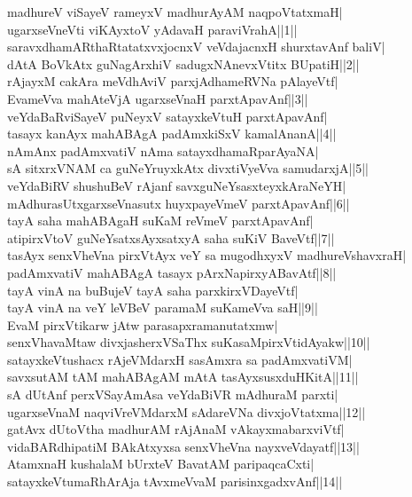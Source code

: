 \documentclass{article}
\begin{document}
madhureV viSayeV rameyxV madhurAyAM naqpoVtatxmaH|\\
ugarxseVneVti viKAyxtoV yAdavaH paraviVrahA||1||\\
saravxdhamARthaRtatatxvxjocnxV veVdajacnxH shurxtavAnf baliV|\\
dAtA BoVkAtx guNagArxhiV sadugxNAnevxVtitx BUpatiH||2||\\
rAjayxM cakAra meVdhAviV parxjAdhameRVNa pAlayeVtf|\\
EvameVva mahAteVjA ugarxseVnaH parxtApavAnf||3||\\
veYdaBaRviSayeV puNeyxV satayxkeVtuH parxtApavAnf|\\
tasayx kanAyx mahABAgA padAmxkiSxV kamalAnanA||4||\\
nAmAnx padAmxvatiV nAma satayxdhamaRparAyaNA|\\
sA sitxrxVNAM ca guNeYruyxkAtx divxtiVyeVva samudarxjA||5||\\
veYdaBiRV shushuBeV rAjanf savxguNeYsasxteyxkAraNeYH|\\
mAdhurasUtxgarxseVnasutx huyxpayeVmeV parxtApavAnf||6||\\
tayA saha mahABAgaH suKaM reVmeV parxtApavAnf|\\
atipirxVtoV guNeYsatxsAyxsatxyA saha suKiV BaveVtf||7||\\
tasAyx senxVheVna pirxVtAyx veY sa mugodhxyxV madhureVshavxraH|\\
padAmxvatiV mahABAgA tasayx pArxNapirxyABavAtf||8||\\
tayA vinA na buBujeV tayA saha parxkirxVDayeVtf|\\
tayA vinA na veY leVBeV paramaM suKameVva saH||9||\\
EvaM pirxVtikarw jAtw parasapxramanutatxmw|\\
senxVhavaMtaw divxjasherxVSaThx suKasaMpirxVtidAyakw||10||\\
satayxkeVtushacx rAjeVMdarxH sasAmxra sa padAmxvatiVM|\\
savxsutAM tAM mahABAgAM mAtA tasAyxsusxduHKitA||11||\\
sA dUtAnf perxVSayAmAsa veYdaBiVR mAdhuraM parxti|\\
ugarxseVnaM naqviVreVMdarxM sAdareVNa divxjoVtatxma||12||\\
gatAvx dUtoVtha madhurAM rAjAnaM vAkayxmabarxviVtf|\\
vidaBARdhipatiM BAkAtxyxsa senxVheVna nayxveVdayatf||13||\\
AtamxnaH kushalaM bUrxteV BavatAM paripaqcaCxti|\\
satayxkeVtumaRhArAja tAvxmeVvaM parisinxgadxvAnf||14||\\
\end{document}
